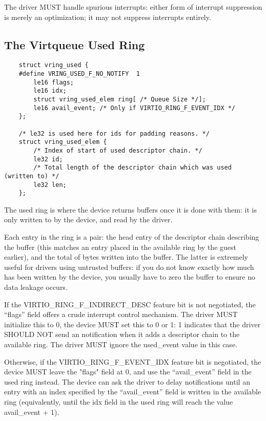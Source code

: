 The driver MUST handle spurious interrupts: either form of interrupt
suppression is merely an optimization; it may not suppress interrupts
entirely.

\subsection{The Virtqueue Used Ring}\label{sec:Basic Facilities of a Virtio Device / Virtqueues / The Virtqueue Used Ring}

\begin{lstlisting}
	struct vring_used {
	#define VRING_USED_F_NO_NOTIFY  1
		le16 flags;
		le16 idx;
		struct vring_used_elem ring[ /* Queue Size */];
		le16 avail_event; /* Only if VIRTIO_RING_F_EVENT_IDX */
	};

	/* le32 is used here for ids for padding reasons. */
	struct vring_used_elem {
		/* Index of start of used descriptor chain. */
		le32 id;
		/* Total length of the descriptor chain which was used (written to) */
		le32 len;
	};
\end{lstlisting}

The used ring is where the device returns buffers once it is done with
them: it is only written to by the device, and read by the driver.

Each entry in the ring is a pair: the head entry of the
descriptor chain describing the buffer (this matches an entry
placed in the available ring by the guest earlier), and the total
of bytes written into the buffer. The latter is extremely useful
for drivers using untrusted buffers: if you do not know exactly
how much has been written by the device, you usually have to zero
the buffer to ensure no data leakage occurs.

If the VIRTIO_RING_F_INDIRECT_DESC feature bit is not negotiated, the
“flags” field offers a crude interrupt control mechanism.  The driver
MUST initialize this to 0, the device MUST set this to 0 or 1: 1
indicates that the driver SHOULD NOT send an notification when it adds
a descriptor chain to the available ring.  The driver MUST ignore the
used_event value in this case.

Otherwise, if the VIRTIO_RING_F_EVENT_IDX feature bit is negotiated,
the device MUST leave the "flags" field at 0, and use the
“avail_event” field in the used ring instead.  The device can ask the
driver to delay notifications until an entry with an index specified
by the “avail_event” field is written in the available ring (equivalently,
until the idx field in the used ring will reach the value avail_event +
1).

